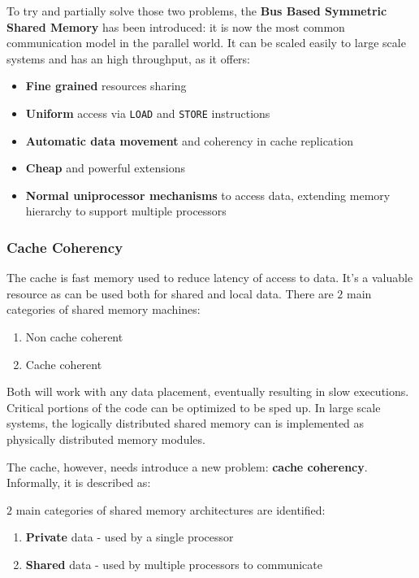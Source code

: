 \documentclass[english]{article}
\begin{document}
To try and partially solve those two problems, the \textbf{Bus Based Symmetric Shared Memory} has been introduced:
it is now the most common communication model in the parallel world.
It can be scaled easily to large scale systems and has an high throughput, as it offers:

\begin{itemize}
  \item \textbf{Fine grained} resources sharing
  \item \textbf{Uniform} access via \texttt{LOAD} and \texttt{STORE} instructions
  \item \textbf{Automatic data movement} and coherency in cache replication
  \item \textbf{Cheap} and powerful extensions
  \item \textbf{Normal uniprocessor mechanisms} to access data, extending memory hierarchy to support multiple processors
\end{itemize}

\subsubsection{Cache Coherency}

The cache is fast memory used to reduce latency of access to data.
It's a valuable resource as can be used both for shared and local data.
There are \(2\) main categories of shared memory machines:

\begin{enumerate}
  \item Non cache coherent
  \item Cache coherent
\end{enumerate}

Both will work with any data placement, eventually resulting in slow executions.
Critical portions of the code can be optimized to be sped up.
In large scale systems, the logically distributed shared memory can is implemented as physically distributed memory modules.

The cache, however, needs introduce a new problem: \textbf{cache coherency}.
Informally, it is described as:


\bigskip
\(2\) main categories of shared memory architectures are identified:

\begin{enumerate}
  \item \textbf{Private} data - used by a single processor
  \item \textbf{Shared} data - used by multiple processors to communicate
\end{enumerate}
\end{document}
